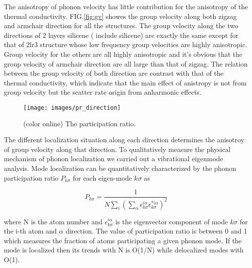 \documentclass[%
 reprint,
 amsmath,amssymb,
 aps,
 prb,
]{revtex4-1}
\begin{document}
The anisotropy of phonon velocity has little contribution for the anisotropy of the thermal conductivity. FIG.\ref{fig:gv} showes the group velocity along both zigzag and armchair direction for all the structures. The group velocity  along the two directions of  2 layers silicene ( include silicene) are exactly the same except for that of 2lr3 structure whose low frequency group velocities are highly anisotropic. Group velocity for the others are all highly anisotropic and it's obvious that the group velocity of armchair direction are all large than that of zigzag. The relation between the group velocity of both direction are contrast with that of the thermal conductivity, which indicate that the main effect of anistropy is not from group velocity but the scatter rate origin from anharmonic effects.

\begin{figure}[b]
  \texttt{[image: images/pr\_direction]}
  \caption{\label{fig:pr_direction} (color online) The participation ratio.}
\end{figure}

The different localization situation  along each direction determines the anisotroy of group velocity  along that direction. To qualitatively measure the physical mechanism of phonon localization we carried out a vibrational eigenmode analysis. Mode localization can be quantitatively characterized by the phonon participation ratio $P_{k\sigma}$  \cite{Allen1999}for each eigen-mode $k\sigma$ as

\begin{equation}
  P_{k\sigma}= \frac{1}{N \sum_{i}
    {(\sum_\alpha{\epsilon^{i\alpha}_{k\sigma}
        \epsilon^{*i\alpha}_{k\sigma}})^2}}
\end{equation}

where N is the atom number and $\epsilon^{i\alpha}_{k\sigma}$ is the eigenvector component of mode $k\sigma$ for the i-th atom and $\alpha$ direction. The value of participation ratio is between 0 and 1 which measures the fraction of atoms participating a given phonon mode. If the mode is localized then its trends with N is O(1/N) while delocalized modes with O(1).
\end{document}

